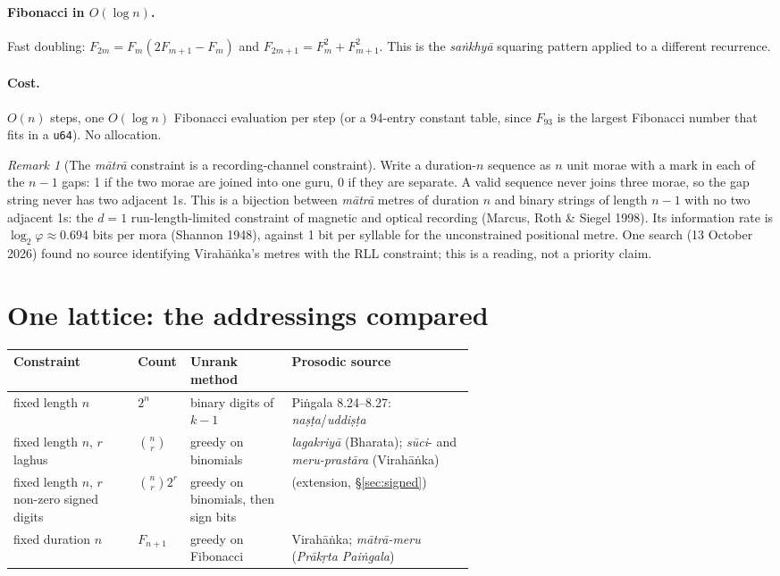\documentclass[11pt,letterpaper]{article}
\newcommand{\skt}[1]{\textit{#1}}
\newcommand{\code}[1]{\texttt{#1}}
\theoremstyle{plain}
\theoremstyle{remark}
\newtheorem*{remark}{Remark}
\begin{document}
\paragraph{Fibonacci in $O(\log n)$.} Fast doubling: $F_{2m} = F_m(2F_{m+1} - F_m)$ and $F_{2m+1} = F_m^2 + F_{m+1}^2$. This is the \skt{saṅkhyā} squaring pattern applied to a different recurrence.

\paragraph{Cost.} $O(n)$ steps, one $O(\log n)$ Fibonacci evaluation per step (or a 94-entry constant table, since $F_{93}$ is the largest Fibonacci number that fits in a \code{u64}). No allocation.

\begin{remark}[The \skt{mātrā} constraint is a recording-channel constraint]
Write a duration-$n$ sequence as $n$ unit morae with a mark in each of the $n-1$ gaps: 1 if the two morae are joined into one guru, 0 if they are separate. A valid sequence never joins three morae, so the gap string never has two adjacent 1s. This is a bijection between \skt{mātrā} metres of duration $n$ and binary strings of length $n-1$ with no two adjacent 1s: the $d=1$ run-length-limited constraint of magnetic and optical recording (Marcus, Roth \& Siegel 1998). Its information rate is $\log_2 \varphi \approx 0.694$ bits per mora (Shannon 1948), against 1 bit per syllable for the unconstrained positional metre. One search (13 October 2026) found no source identifying Virahāṅka's metres with the RLL constraint; this is a reading, not a priority claim.
\end{remark}

\section{One lattice: the addressings compared}\label{sec:lattice}

{\small
\noindent\begin{tabularx}{\linewidth}{@{}>{\raggedright\arraybackslash}p{0.27\linewidth}>{\raggedright\arraybackslash}p{0.11\linewidth}>{\raggedright\arraybackslash}p{0.22\linewidth}X@{}}
\toprule
\textbf{Constraint} & \textbf{Count} & \textbf{Unrank method} & \textbf{Prosodic source}\\
\midrule
fixed length $n$ & $2^n$ & binary digits of $k-1$ & Piṅgala 8.24--8.27: \skt{naṣṭa}/\skt{uddiṣṭa}\\
fixed length $n$, $r$ laghus & $\binom{n}{r}$ & greedy on binomials & \skt{lagakriyā} (Bharata); \skt{sūci}- and \skt{meru-prastāra} (Virahāṅka)\\
fixed length $n$, $r$ non-zero signed digits & $\binom{n}{r}2^r$ & greedy on binomials, then sign bits & (extension, §\ref{sec:signed})\\
fixed duration $n$ & $F_{n+1}$ & greedy on Fibonacci & Virahāṅka; \skt{mātrā-meru} (\skt{Prākṛta Paiṅgala})\\
\bottomrule
\end{tabularx}
}
\end{document}
